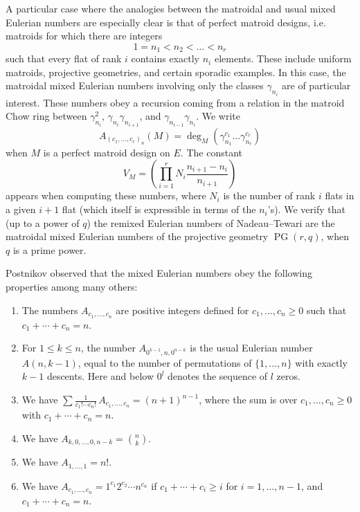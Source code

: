 \documentclass[ALCO,published]{cedram}
\numberwithin{equation}{section}
\numberwithin{figure}{section}
\DeclareMathOperator{\PG}{PG}
\begin{document}
A particular case where the analogies between the matroidal and usual mixed Eulerian numbers are especially clear is that of perfect matroid designs, i.e. matroids for which there are integers 
\[1=n_1<n_2<\dots<n_r\]
such that every flat of rank $i$ contains exactly $n_i$ elements. These include uniform matroids, projective geometries, and certain sporadic examples. In this case, the matroidal mixed Eulerian numbers involving only the classes $\gamma_{n_i}$ are of particular interest. These numbers obey a recursion coming from a relation in the matroid Chow ring between $\gamma_{n_i}^2$, $\gamma_{n_i}\gamma_{n_{i+1}}$, and $\gamma_{n_{i-1}}\gamma_{n_i}$. 
We write
\[A_{(c_1,\dots,c_r)_n}(M)=\deg_M(\gamma_{n_1}^{c_1}\dots\gamma_{n_r}^{c_r})\]
when $M$ is a perfect matroid design on $E$.
The constant
\[V_M=\left(\prod_{i=1}^r  N_i 
 \frac{n_{i+1}-n_i}{n_{i+1}}\right)\]
appears when computing these numbers, where $N_i$ is the number of rank $i$ flats in a given $i+1$ flat (which itself is expressible in terms of the $n_i$'s).
We verify that (up to a power of $q$) the remixed Eulerian numbers of Nadeau--Tewari \cite{NT:remixed} are the matroidal mixed Eulerian numbers of the projective geometry $\PG(r,q)$, when $q$ is a prime power.

Postnikov observed that the mixed Eulerian numbers obey the following
properties among many others:

\begin{enumerate}
\item The numbers $A_{c_1,\dots,c_n}$ are positive integers defined
for $c_1,\dots,c_n\geq 0$ such that $c_1+\cdots+c_n=n$.

\item For $1\leq k\leq n$, the number $A_{0^{k-1},n,0^{n-k}}$  
is the usual Eulerian number $A(n,k-1)$, equal to the number of permutations of $\{1,\ldots,n\}$ with exactly $k-1$ descents.
Here and below $0^l$ denotes the sequence of $l$ zeros.

\item We have $\sum 
\frac{1}{c_1!\cdots c_n!}\,A_{c_1,\dots,c_n} = (n+1)^{n-1}$,
where the sum is over $c_1,\dots,c_n\geq 0$ with $c_1+\cdots + c_n = n$.

\item We have $A_{k,0,\dots,0,n-k} = \binom{n}{k}$.

\item We have $A_{1,\dots,1}=n!$.

\item We have $A_{c_1,\dots,c_n} = 1^{c_1} 2^{c_2} \cdots n^{c_n}$
if $c_1+\cdots + c_i \geq i$ for $i=1,\dots,n-1$,
and $c_1+\cdots + c_n = n$.
\end{enumerate}
\end{document}
